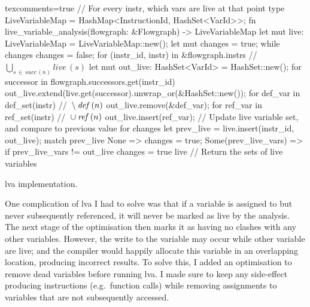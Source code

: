 \documentclass[00-main.tex]{subfiles}
\begin{document}
\begin{listing}[!t]
  \begin{RustListing*}{texcomments=true}
    // For every instr, which vars are live at that point
    type LiveVariableMap = HashMap<InstructionId, HashSet<VarId>>;
    fn live_variable_analysis(flowgraph: &Flowgraph) -> LiveVariableMap {
        let mut live: LiveVariableMap = LiveVariableMap::new();
        let mut changes = true;
        while changes {
            changes = false;
            for (instr_id, instr) in &flowgraph.instrs {
                // $\bigcup_{s \,\in\, \mathit{succ}\,(n)} \mathit{live}\,(s)$
                let mut out_live: HashSet<VarId> = HashSet::new();
                for successor in flowgraph.successors.get(instr_id) {
                    out_live.extend(live.get(successor).unwrap_or(&HashSet::new());
                }
                for def_var in def_set(instr) { // ${} \setminus \lvadef\,(n)$
                    out_live.remove(&def_var);
                }
                for ref_var in ref_set(instr) { // ${} \cup \lvaref\,(n)$
                    out_live.insert(ref_var);
                }
                // Update live variable set, and compare to previous value for changes
                let prev_live = live.insert(instr_id, out_live);
                match prev_live {
                    None => {
                        changes = true;
                    }
                    Some(prev_live_vars) => {
                        if prev_live_vars != out_live {
                            changes = true
                        }
                    }
                }
            }
        }
        live // Return the sets of live variables
    }
  \end{RustListing*}
  \caption{\Acrlong{lva} implementation.}%
  \label{lst:lva implementation}
\end{listing}

One complication of \gls{lva} I had to solve was that if a variable is assigned to but never subsequently referenced, it will never be marked as live by the analysis.
The next stage of the optimisation then marks it as having no clashes with any other variables.
However, the write to the variable may occur while other variable are live; and the compiler would happily allocate this variable in an overlapping location, producing incorrect results.
To solve this, I added an optimisation to remove dead variables before running \gls{lva}.
I made sure to keep any side-effect producing instructions (e.g.~function calls) while removing assignments to variables that are not subsequently accessed.
\end{document}
